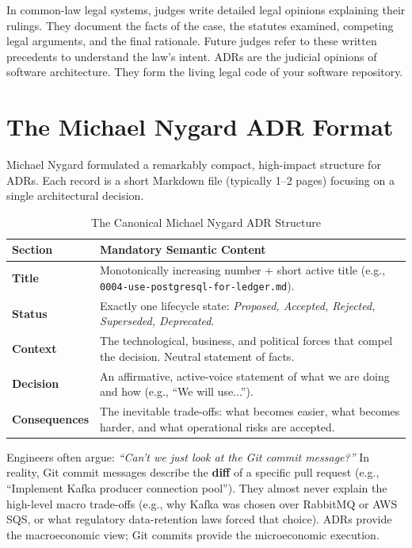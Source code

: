 \begin{intuitionbox}
In common-law legal systems, judges write detailed legal opinions explaining their rulings. They document the facts of the case, the statutes examined, competing legal arguments, and the final rationale. Future judges refer to these written precedents to understand the law's intent. ADRs are the judicial opinions of software architecture. They form the living legal code of your software repository.
\end{intuitionbox}

\section{The Michael Nygard ADR Format}

Michael Nygard formulated a remarkably compact, high-impact structure for ADRs. Each record is a short Markdown file (typically 1--2 pages) focusing on a single architectural decision.

\begin{table}[htbp]
\centering\small
\begin{tabular}{lp{10.5cm}}
\toprule
\textbf{Section} & \textbf{Mandatory Semantic Content} \\
\midrule
\textbf{Title} & Monotonically increasing number + short active title (e.g., \texttt{0004-use-postgresql-for-ledger.md}). \\
\textbf{Status} & Exactly one lifecycle state: \textit{Proposed, Accepted, Rejected, Superseded, Deprecated}. \\
\textbf{Context} & The technological, business, and political forces that compel the decision. Neutral statement of facts. \\
\textbf{Decision} & An affirmative, active-voice statement of what we are doing and how (e.g., ``We will use...''). \\
\textbf{Consequences} & The inevitable trade-offs: what becomes easier, what becomes harder, and what operational risks are accepted. \\
\bottomrule
\end{tabular}
\caption{The Canonical Michael Nygard ADR Structure}
\label{tab:nygard-adr}
\end{table}

\begin{underthehoodbox}
Engineers often argue: \textit{``Can't we just look at the Git commit message?''} In reality, Git commit messages describe the \textbf{diff} of a specific pull request (e.g., ``Implement Kafka producer connection pool''). They almost never explain the high-level macro trade-offs (e.g., why Kafka was chosen over RabbitMQ or AWS SQS, or what regulatory data-retention laws forced that choice). ADRs provide the macroeconomic view; Git commits provide the microeconomic execution.
\end{underthehoodbox}

